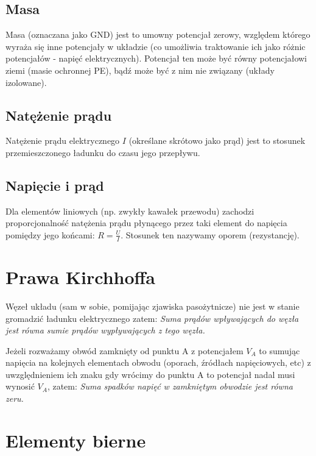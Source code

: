 \documentclass{pdfBooklets}
\begin{document}
\subsection{Masa}
   Masa (oznaczana jako GND) jest to
   umowny potencjał zerowy, względem którego wyraża się inne potencjały w układzie (co umożliwia traktowanie ich jako różnic potencjałów - napięć elektrycznych). Potencjał ten może być równy potencjałowi ziemi (masie ochronnej PE), bądź może być z nim nie związany (układy izolowane).

\subsection{Natężenie prądu}
    Natężenie prądu elektrycznego $I$ (określane skrótowo jako prąd)
    jest to stosunek przemieszczonego ładunku do czasu jego przepływu.

\subsection{Napięcie i prąd}
Dla elementów liniowych (np. zwykły kawałek przewodu) zachodzi proporcjonalność natężenia prądu płynącego przez taki element do napięcia pomiędzy jego końcami: $R=\frac{U}{I}$. Stosunek ten nazywamy oporem (rezystancję).

\section{Prawa Kirchhoffa}
Węzeł układu (sam w sobie, pomijając zjawiska pasożytnicze) nie jest w stanie gromadzić ładunku elektrycznego zatem: \emph{Suma prądów wpływających do węzła jest równa sumie prądów wypływających z tego węzła.}

Jeżeli rozważamy obwód zamknięty od punktu A z potencjałem $V_A$ to sumując napięcia na kolejnych elementach obwodu (oporach, źródłach napięciowych, etc) z uwzględnieniem ich znaku gdy wrócimy do punktu A to potencjał nadal musi wynosić $V_A$, zatem: \emph{Suma spadków napięć w zamkniętym obwodzie jest równa zeru.}


\section{Elementy bierne}
\end{document}
